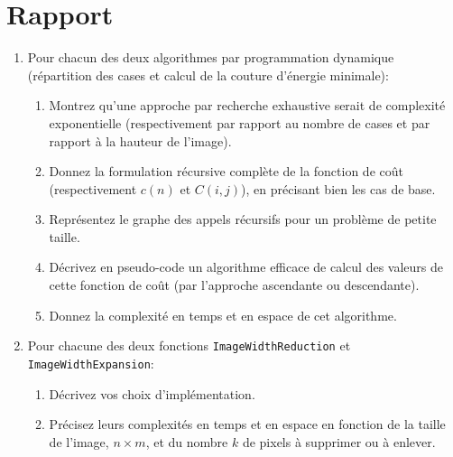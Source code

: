 \documentclass[a4paper,10pt]{article}
\begin{document}
\section{Rapport}


\begin{enumerate}
\item Pour chacun des deux algorithmes par programmation dynamique
  (répartition des cases et calcul de la couture d'énergie
  minimale):
\begin{enumerate}
\item Montrez qu'une approche par recherche exhaustive serait de
  complexité exponentielle (respectivement par rapport au nombre de
  cases et par rapport à la hauteur de l'image).
\item Donnez la formulation récursive complète de la fonction de coût
  (respectivement $c(n)$ et $C(i,j)$), en précisant bien les cas de base.
\item Représentez le graphe des appels récursifs pour un problème de
  petite taille.
\item Décrivez en pseudo-code un algorithme efficace de calcul des
  valeurs de cette fonction de coût (par l'approche ascendante ou
  descendante).
\item Donnez la complexité en temps et en espace de cet algorithme.
\end{enumerate}
\item Pour chacune des deux fonctions \texttt{ImageWidthReduction} et \texttt{ImageWidthExpansion}:
\begin{enumerate}
\item Décrivez vos choix d'implémentation.
\item Précisez leurs complexités en temps et en espace en fonction de
  la taille de l'image, $n\times m$, et du nombre $k$ de pixels à
  supprimer ou à enlever.
\end{enumerate}
\end{enumerate}




\end{document}
